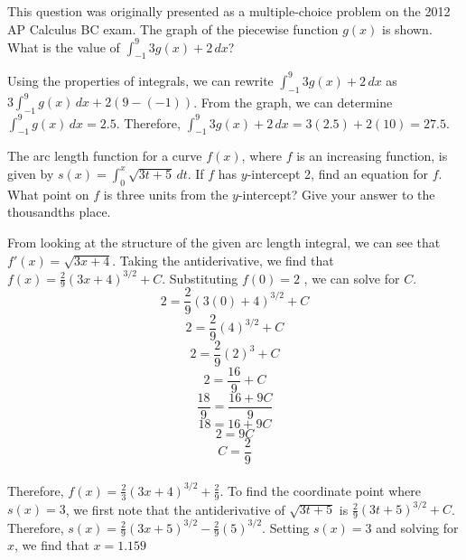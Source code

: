 \begin{Exercise}[label=defint4]
	This question was originally presented as a multiple-choice problem 
	on the 2012 AP Calculus BC exam. The graph of the piecewise function 
	$g(x)$ is shown. What is the value of $\int_{-1}^{9} 3 g(x) + 2\,dx$?
	
\end{Exercise}

\begin{Answer}[ref=defint4]
Using the properties of integrals, we can rewrite $\int_{-1}^{9} 3 
g(x) + 2\,dx$ as $3 \int_{-1}^{9} g(x)\,dx + 2 (9-(-1))$. From the 
graph, we can determine $\int_{-1}^{9} g(x)\,dx = 2.5$. Therefore, 
$\int_{-1}^{9} 3 g(x) + 2\,dx = 3 (2.5) + 2 (10) = 27.5$. 
\end{Answer}

\begin{Exercise}[label=defint5]
The arc length function for a curve $f(x)$, where $f$ is an increasing 
function, is given by $s(x) = \int_{0}^{x} \sqrt{3t + 5}\,dt$. If $f$ 
has $y$-intercept 2, find an equation for $f$. What point on $f$ is 
three units from the $y$-intercept? Give your answer to the thousandths 
place. 
\end{Exercise}

\begin{Answer}[ref=defint5]
From looking at the structure of the given arc length integral, we can 
see that $f'(x) = \sqrt{3x + 4}$. Taking the antiderivative, we find 
that $f(x) = \frac{2}{9}(3x + 4)^{3 / 2} + C$. Substituting $f(0) = 2$
, we can solve for $C$. $$2 = \frac{2}{9}(3(0) + 4)^{3 / 2} + C$$ 
$$2 = \frac{2}{9}(4)^{3 / 2} + C$$ 
$$2 = \frac{2}{9}(2)^3 + C$$ 
$$2 = \frac{16}{9} + C$$ 
$$\frac{18}{9} = \frac{16 + 9C}{9}$$ 
$$18 = 16 + 9C$$ 
$$2 = 9C$$ 
$$C = \frac{2}{9}$$\\ 
Therefore, $f(x) = \frac{2}{3}(3x + 4)^{3 / 2} + \frac{2}{9}$. To find 
the coordinate point where $s(x) = 3$, we first note that the 
antiderivative of $\sqrt{3t + 5}$ is $\frac{2}{9}(3t + 5)^{3 / 2} + C$. 
Therefore, $s(x) = \frac{2}{9}(3x + 5)^{3 / 2} - \frac{2}{9}(5)^{3 / 2}$. 
Setting $s(x) = 3$ and solving for $x$, we find that $x = 1.159$
\end{Answer}

